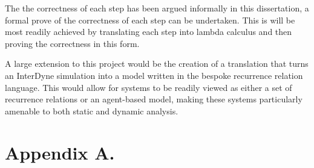 \documentclass{article}
\begin{document}
The the correctness of each step has been argued informally in this dissertation, a formal prove of the correctness of each step can be undertaken. This is will be most readily achieved by translating each step into lambda calculus and then proving the correctness in this form. 

A large extension to this project would be the creation of a translation that turns an InterDyne simulation into a model written in the bespoke recurrence relation language. This would allow for systems to be readily viewed as either a set of recurrence relations or an agent-based model, making these systems particularly amenable to both static and dynamic analysis.  





 
\section{Appendix A.}

%











     
\end{document}
